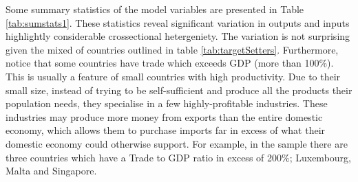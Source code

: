 \documentclass[12pt,]{article}
\begin{document}
Some summary statistics of the model variables are presented in Table \ref{tab:sumstats1}. These statistics reveal significant variation in outputs and inputs highlightly considerable crossectional hetergeniety. The variation is not surprising given the mixed of countries outlined in table \ref{tab:targetSetters}. Furthermore, notice that some countries have trade which exceeds GDP (more than 100\%). This is usually a feature of small countries with high productivity. Due to their small size, instead of trying to be self-sufficient and produce all the products their population needs, they specialise in a few highly-profitable industries. These industries may produce more money from exports than the entire domestic economy, which allows them to purchase imports far in excess of what their domestic economy could otherwise support. For example, in the sample there are three countries which have a Trade to GDP ratio in excess of 200\%; Luxembourg, Malta and Singapore.
\end{document}
